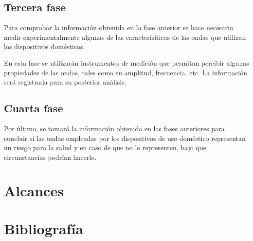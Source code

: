 \documentclass[spanish,notitlepage,letterpaper, 12pt]{article}
\begin{document}
\subsection{Tercera fase}
Para comprobar la información obtenida en la fase anterior se hace necesario medir experimentalmente algunas de las caracterísiticas de las ondas que utilizan los dispositivos domésticos.\par
\bigskip
En esta fase se utilizarán instrumentos de medición que permitan percibir algunas propiedades de las ondas, tales como su amplitud, frecuencia, etc. La información será registrada para su posterior análisis.
\subsection{Cuarta fase}
Por último, se tomará la información obtenida en las fases anteriores para concluir si las ondas empleadas por los dispositivos de uso doméstico representan un riesgo para la salud y en caso de que no lo representen, bajo que circunstancias podrían hacerlo.
\section{Alcances}
\section{Bibliografía} 


\end{document}
